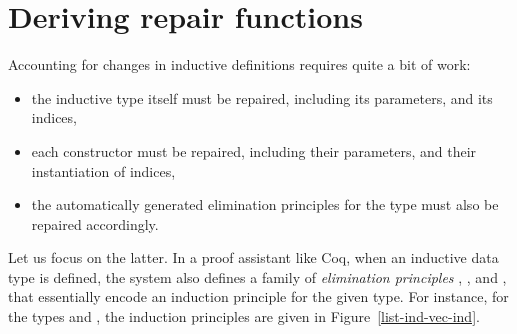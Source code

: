 \section{Deriving repair functions}\label{chick-deriving}

Accounting for changes in inductive definitions requires quite a bit of work:

\begin{itemize}

\item the inductive type itself must be repaired, including its parameters, and
its indices,

\item each constructor must be repaired, including their parameters, and their
instantiation of indices,

\item the automatically generated elimination principles for the type must also
be repaired accordingly.

\end{itemize}%
%
Let us focus on the latter.  In a proof assistant like Coq, when an inductive
data type  is defined, the system also defines a family of
\textit{elimination principles} , , and
, that essentially encode an induction principle for the given
type.  For instance, for the types  and , the
induction principles are given in Figure~\ref{list-ind-vec-ind}.

